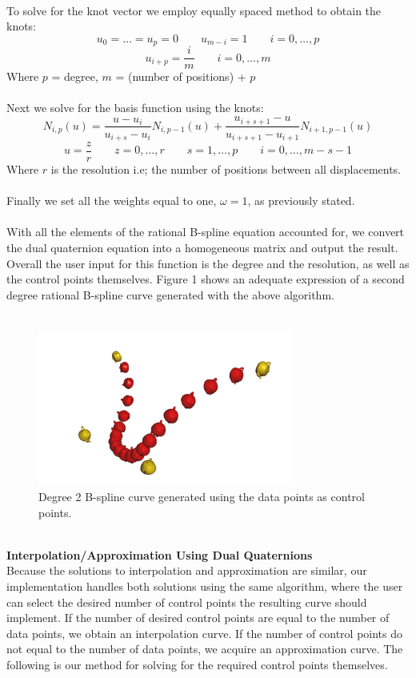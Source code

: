 \documentclass[11pt]{article}
\begin{document}
\\
To solve for the knot vector we employ equally spaced method to obtain the knots:
$$ u_0 = \ldots = u_p = 0 \qquad u_{m-i} = 1 \qquad i = 0,\ldots , p$$
$$ u_{i+p} = \frac{i}{m} \qquad i = 0,\ldots, m$$
Where $p$ = degree, $m$ = (number of positions) + $p$
\\
\\
Next we solve for the basis function using the knots:
$$ N_{i,p}(u) = \frac{u-u_i}{u_{i+s}-u_i} N_{i,p-1}(u)+ \frac{u_{i+s+1}-u}{u_{i+s+1}-u_{i+1}} N_{i+1,p-1}(u)$$
$$ u = \frac{z}{r} \qquad z = 0,\ldots , r \qquad s = 1,\ldots , p \qquad i = 0,\ldots , m-s-1 $$
Where $r$ is the resolution i.e; the number of positions between all displacements.
\\
\\
Finally we set all the weights equal to one, $\omega = 1$, as previously stated.
\\
\\
With all the elements of the rational B-spline equation accounted for, we convert the dual quaternion equation into a homogeneous matrix and output the result. Overall the user input for this function is the degree and the resolution, as well as the control points themselves. Figure 1 shows an adequate expression of a second degree rational B-spline curve generated with the above algorithm.
\\
\\
\begin{figure}[h]
  \centering
  \includegraphics[width=0.75\textwidth]{B-spline.png}
  \caption{Degree 2 B-spline curve generated using the data points as control points.}
  \label{Figure: 1}
\end{figure}
\\
\textbf{\large{Interpolation/Approximation Using Dual Quaternions}}
\\
Because the solutions to interpolation and approximation are similar, our implementation handles both solutions using the same algorithm, where the user can select the desired number of control points the resulting curve should implement. If the number of desired control points are equal to the number of data points, we obtain an interpolation curve. If the number of control points do not equal to the number of data points, we acquire an approximation curve. The following is our method for solving for the required control points themselves.
\end{document}
